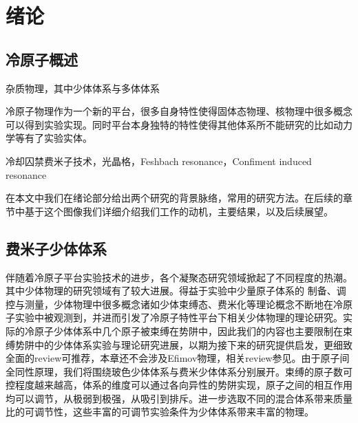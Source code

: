 \chapter{绪论}\label{chap:kondo}



\section{冷原子概述}

杂质物理，其中少体体系与多体体系

冷原子物理作为一个新的平台，很多自身特性使得固体态物理、核物理中很多概念可以得到实验实现。同时平台本身独特的特性使得其他体系所不能研究的比如动力学等有了实验实体。

冷却囚禁费米子技术，光晶格，Feshbach resonance，Confiment induced resonance

在本文中我们在绪论部分给出两个研究的背景脉络，常用的研究方法。在后续的章节中基于这个图像我们详细介绍我们工作的动机，主要结果，以及后续展望。


\section{费米子少体体系}\label{sec:fewbody}
伴随着冷原子平台实验技术的进步，各个凝聚态研究领域掀起了不同程度的热潮。其中少体物理的研究领域有了较大进展。得益于实验中少量原子体系的
制备、调控与测量，少体物理中很多概念诸如少体束缚态、费米化等理论概念不断地在冷原子实验中被观测到，并进而引发了冷原子特性平台下相关少体物理的理论研究。实际的冷原子少体体系中几个原子被束缚在势阱中，因此我们的内容也主要限制在束缚势阱中的少体体系实验与理论研究进展，以期为接下来的研究提供启发，更细致全面的review可推荐\cite{sowinski2019one,blume2012few}，本章还不会涉及Efimov物理，相关review参见\cite{nielsen2001three,braaten2006universality,KohlerMolFRRMP}。由于原子间全同性原理，我们将围绕玻色少体体系与费米少体体系分别展开。束缚的原子数可控程度越来越高，体系的维度可以通过各向异性的势阱实现，原子之间的相互作用均可以调节，从极弱到极强，从吸引到排斥。进一步选取不同的混合体系带来质量比的可调节性，这些丰富的可调节实验条件为少体体系带来丰富的物理。

